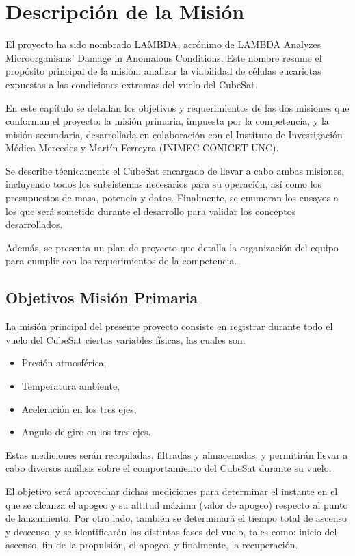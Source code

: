\chapter{Descripción de la Misión}
El proyecto ha sido nombrado LAMBDA, acrónimo de LAMBDA Analyzes Microorganisms' Damage in
Anomalous Conditions. Este nombre resume el propósito principal de la misión: analizar la
viabilidad de células eucariotas expuestas a las condiciones extremas del vuelo del CubeSat.

En este capítulo se detallan los objetivos y requerimientos de las dos misiones que conforman el
proyecto:
la misión primaria, impuesta por la competencia, y la misión secundaria, desarrollada en
colaboración con el Instituto de Investigación Médica Mercedes y Martín Ferreyra (INIMEC-CONICET
UNC).

Se describe técnicamente el CubeSat encargado de llevar a cabo ambas misiones, incluyendo todos
los subsistemas necesarios para su operación, así como los presupuestos de masa, potencia y datos.
Finalmente, se enumeran los ensayos a los que será sometido durante el desarrollo para validar
los conceptos desarrollados.

Además, se presenta un plan de proyecto que detalla la organización del equipo para cumplir con
los requerimientos de la competencia.

\section{Objetivos Misión Primaria}
La misión principal del presente proyecto consiste en registrar durante todo el vuelo del
CubeSat ciertas variables físicas, las cuales son:

  \begin{itemize}
    \item Presión atmosférica,
    \item Temperatura ambiente,
    \item Aceleración en los tres ejes,
    \item Angulo de giro en los tres ejes.
  \end{itemize}

Estas mediciones serán recopiladas, filtradas y almacenadas, y permitirán llevar a cabo
diversos análisis sobre el comportamiento del CubeSat durante su vuelo.

El objetivo será aprovechar dichas mediciones para determinar el instante en el que se
alcanza el apogeo y su altitud máxima (valor de apogeo) respecto al punto de lanzamiento.
Por otro lado, también se determinará el tiempo total de ascenso y descenso, y se identificarán
las distintas fases del vuelo, tales como: inicio del ascenso, fin de la propulsión, el apogeo,
y finalmente, la recuperación.


